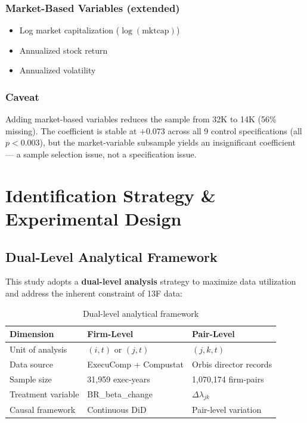 \documentclass[11pt,a4paper]{article}
\begin{document}
\subsubsection*{Market-Based Variables (extended)}
\begin{itemize}[nosep]
  \item Log market capitalization (\(\log(\text{mktcap})\))
  \item Annualized stock return
  \item Annualized volatility
\end{itemize}

\subsubsection*{Caveat}
Adding market-based variables reduces the sample from 32K to 14K (56\% missing). The coefficient is stable at \(+0.073\) across all 9 control specifications (all \(p < 0.003\)), but the market-variable subsample yields an insignificant coefficient — a sample selection issue, not a specification issue.

\newpage

\section{Identification Strategy \& Experimental Design}

\subsection{Dual-Level Analytical Framework}

This study adopts a {\bf dual-level analysis} strategy to maximize data utilization and address the inherent constraint of 13F data:

\begin{table}[h!]
\centering
\begin{tabular}{p{3cm}p{5cm}p{5cm}}
\toprule
\textbf{Dimension} & \textbf{Firm-Level} & \textbf{Pair-Level} \\
\midrule
Unit of analysis & \((i, t)\) or \((j, t)\) & \((j, k, t)\) \\
Data source & ExecuComp + Compustat & Orbis director records \\
Sample size & 31,959 exec-years & 1,070,174 firm-pairs \\
Treatment variable & BR\_beta\_change & \(\Delta\lambda_{jk}\) \\
Causal framework & Continuous DiD & Pair-level variation \\
\bottomrule
\end{tabular}
\caption{Dual-level analytical framework}
\end{table}
\end{document}
